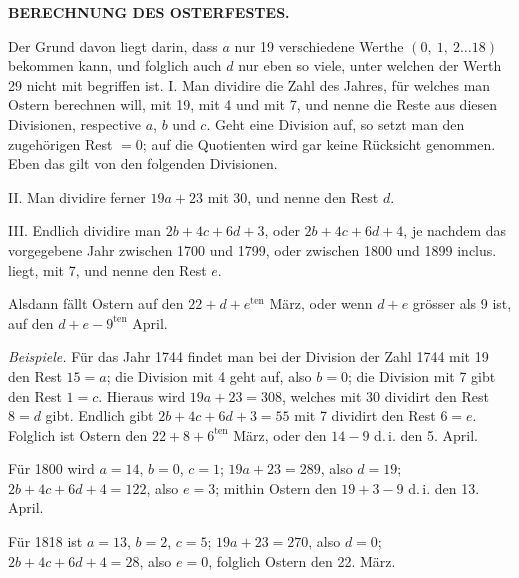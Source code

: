 \thispagestyle{gaussVIGathering}
\clearpage
\endgroup
\clearpage
\begingroup
\pagestyle{empty}
\renewcommand{\footnoterule}{\kern-3pt\hrule width .257\linewidth\kern2.6pt}
\thispagestyle{empty}
\noindent{}%
%
\parbox[t]{\dimexpr\linewidth-24mm\relax}{\centering\footnotesize\bfseries BERECHNUNG DES OSTERFESTES.\par}%
\makebox[12mm][r]{}\par\nobreak\medskip
\expandafter\def\csname HistoricalNoteText2\endcsname{Der Grund davon liegt darin, dass $a$ nur 19 verschiedene Werthe $(0,\ 1,\ 2\ldots18)$ bekommen
kann, und folglich auch $d$ nur eben so viele, unter welchen der Werth 29 nicht mit begriffen ist.}
I. Man dividire die Zahl des Jahres, für welches man Ostern berechnen
will, mit 19, mit 4 und mit 7, und nenne die Reste aus diesen Divisionen, respective
$a$, $b$ und $c$. Geht eine Division auf, so setzt man den zugehörigen Rest
$=0$; auf die Quotienten wird gar keine Rücksicht genommen. Eben das gilt
von den folgenden Divisionen.

II. Man dividire ferner $19a+23$ mit 30, und nenne den Rest $d$.

III. Endlich dividire man $2b+4c+6d+3$, oder $2b+4c+6d+4$, je
nachdem das vorgegebene Jahr zwischen 1700 und 1799, oder zwischen 1800
und 1899 inclus. liegt, mit 7, und nenne den Rest $e$.

Alsdann fällt Ostern auf den $22+d+e^{\mathrm{ten}}$ März, oder wenn $d+e$ grösser
als 9 ist, auf den $d+e-9^{\mathrm{ten}}$ April.

\textit{Beispiele.} Für das Jahr 1744 findet man bei der Division der Zahl 1744
mit 19 den Rest $15=a$; die Division mit 4 geht auf, also $b=0$; die Division
mit 7 gibt den Rest $1=c$. Hieraus wird $19a+23=308$, welches mit
30 dividirt den Rest $8=d$ gibt. Endlich gibt $2b+4c+6d+3=55$ mit 7
dividirt den Rest $6=e$. Folglich ist Ostern den $22+8+6^{\mathrm{ten}}$ März, oder den
$14-9$ d.\,i. den 5. April.

Für 1800 wird $a=14$, $b=0$, $c=1$; $19a+23=289$, also $d=19$;
$2b+4c+6d+4=122$, also $e=3$; mithin Ostern den $19+3-9$ d.\,i. den
13. April.

Für 1818 ist $a=13$, $b=2$, $c=5$; $19a+23=270$, also $d=0$;
$2b+4c+6d+4=28$, also $e=0$, folglich Ostern den 22. März.

